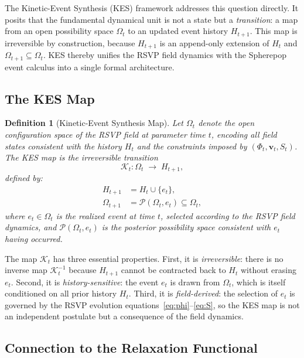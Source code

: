 \documentclass[12pt,a4paper]{article}
\newtheorem{definition}[theorem]{Definition}
\theoremstyle{remark}
\newcommand{\vv}{\mathbf{v}}
\begin{document}
The Kinetic-Event Synthesis (KES) framework addresses this question directly.
It posits that the fundamental dynamical unit is not a state but a
\emph{transition}: a map from an open possibility space $\Omega_t$ to an
updated event history $H_{t+1}$. This map is irreversible by construction,
because $H_{t+1}$ is an append-only extension of $H_t$ and $\Omega_{t+1}
\subseteq \Omega_t$. KES thereby unifies the RSVP field dynamics with the
Spherepop event calculus into a single formal architecture.

\subsection{The KES Map}

\begin{definition}[Kinetic-Event Synthesis Map]
Let $\Omega_t$ denote the open configuration space of the RSVP field at
parameter time $t$, encoding all field states consistent with the history
$H_t$ and the constraints imposed by $(\Phi_t, \vv_t, S_t)$. The
\emph{KES map} is the irreversible transition
\begin{equation}
\boxed{\mathcal{K}_t : \Omega_t \;\longrightarrow\; H_{t+1},}
\label{eq:kes_map}
\end{equation}
defined by:
\begin{align}
H_{t+1} &= H_t \cup \{e_t\}, \label{eq:kes_history}\\
\Omega_{t+1} &= \mathcal{P}(\Omega_t, e_t) \subseteq \Omega_t, \label{eq:kes_omega}
\end{align}
where $e_t \in \Omega_t$ is the realized event at time $t$, selected
according to the RSVP field dynamics, and $\mathcal{P}(\Omega_t, e_t)$
is the posterior possibility space consistent with $e_t$ having occurred.
\end{definition}

The map $\mathcal{K}_t$ has three essential properties. First, it is
\emph{irreversible}: there is no inverse map $\mathcal{K}_t^{-1}$ because
$H_{t+1}$ cannot be contracted back to $H_t$ without erasing $e_t$.
Second, it is \emph{history-sensitive}: the event $e_t$ is drawn from
$\Omega_t$, which is itself conditioned on all prior history $H_t$. Third,
it is \emph{field-derived}: the selection of $e_t$ is governed by the
RSVP evolution equations~\eqref{eq:phi}--\eqref{eq:S}, so the KES map is
not an independent postulate but a consequence of the field dynamics.

\subsection{Connection to the Relaxation Functional}
\end{document}
